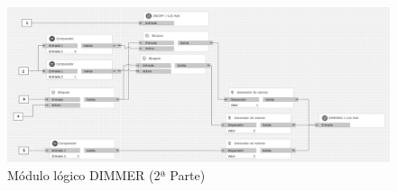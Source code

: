 \begin{center}
\begin{figure}[H]
\includegraphics[width=1.05\textwidth]{figures/log_dimm_der.png}   
\caption{Módulo lógico DIMMER (2ª Parte)}
\label{fig:log_dimm_der}
\end{figure}
\end{center}

